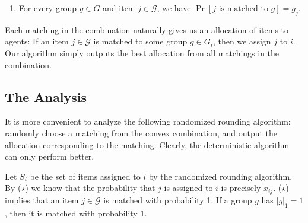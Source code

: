 \documentclass{theoretics}
\newcommand\calG{{\mathcal{G}}}
\begin{document}
    \begin{enumerate}[label = ($\star$)]
        \item For every group $g \in G$ and item $j \in \calG$, we have $\Pr[j\text{ is matched to }g] = g_j$.
    \end{enumerate}

    Each matching in the combination naturally gives us an allocation of items to agents: If an item $j \in \calG$ is matched to some group $g \in G_i$, then we assign $j$ to $i$.  Our algorithm simply outputs the best allocation from all matchings in the combination.  
    

\subsection{The Analysis} \label{sec:analysis}
    It is more convenient to analyze the following randomized rounding algorithm: randomly choose a matching from the convex combination, and output the allocation corresponding to the matching. Clearly, the deterministic algorithm can only perform better. 


    Let $S_i$ be the set of items assigned to $i$ by the randomized rounding algorithm. By ($\star$) we know that the probability that $j$ is assigned to $i$ is precisely $x_{ij}$. ($\star$) implies that an item $j \in \calG$ is matched with probability 1. If a group $g$ has $|g|_1 = 1$, then it is matched with probability 1.
\end{document}
